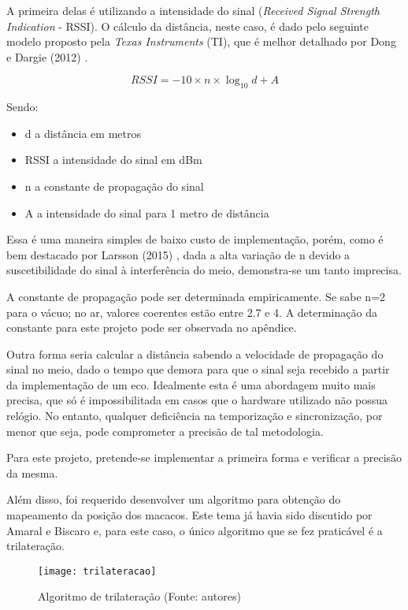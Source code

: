 A primeira delas é utilizando a intensidade do sinal (\emph{Received Signal Strength Indication} - RSSI). O cálculo da distância, neste caso, é dado pelo seguinte modelo proposto pela \emph{Texas Instruments} (TI), que é melhor detalhado por Dong e Dargie (2012) \cite{dong}.

\begin{equation}
RSSI = -10 \times n \times \log_{10} d + A
\end{equation}

Sendo:
\begin{itemize}
\item d a distância em metros
\item RSSI a intensidade do sinal em dBm
\item n a constante de propagação do sinal
\item A a intensidade do sinal para 1 metro de distância
\end{itemize}

Essa é uma maneira simples de baixo custo de implementação, porém, como é bem destacado por Larsson (2015) \cite{larsson}, dada a alta variação de n devido a suscetibilidade do sinal à interferência do meio, demonstra-se um tanto imprecisa.

A constante de propagação pode ser determinada empiricamente. Se sabe n=2 para o vácuo; no ar, valores coerentes estão entre 2.7 e 4. A determinação da constante para este projeto pode ser observada no apêndice.

Outra forma seria calcular a distância sabendo a velocidade de propagação do sinal no meio, dado o tempo que demora para que o sinal seja recebido a partir da implementação de um eco. Idealmente esta é uma abordagem muito mais precisa, que só é impossibilitada em casos que o hardware utilizado não possua relógio. No entanto, qualquer deficiência na temporização e sincronização, por menor que seja, pode comprometer a precisão de tal metodologia.

Para este projeto, pretende-se implementar a primeira forma e verificar a precisão da mesma.

Além disso, foi requerido desenvolver um algoritmo para obtenção do mapeamento da posição dos macacos. Este tema já havia sido discutido por Amaral e Biscaro \cite{larissaamaralmiltonbiscaro} e, para este caso, o único algoritmo que se fez praticável é a trilateração.

\begin{figure}[ht]
  \centering
    \texttt{[image: trilateracao]}
  \caption{Algoritmo de trilateração (Fonte: autores)}
\end{figure}
\FloatBarrier

